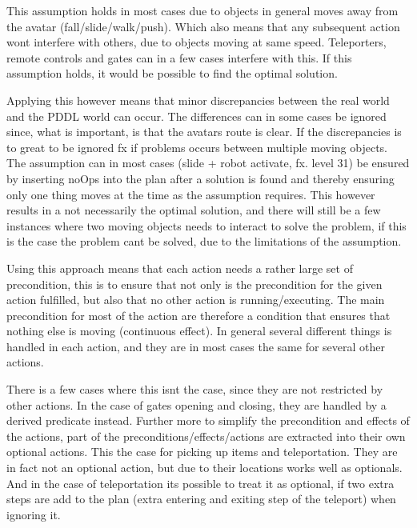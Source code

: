 		This assumption holds in most cases due to objects in general moves away from the avatar (fall/slide/walk/push). Which also means that any subsequent action wont interfere with others, due to objects moving at same speed. Teleporters, remote controls and gates can in a few cases interfere with this. If this assumption holds, it would be possible to find the optimal solution.
		
		Applying this however means that minor discrepancies between the real world and the PDDL world can occur. The differences can in some cases be ignored since, what is important, is that the avatars route is clear. If the discrepancies is to great to be ignored fx if problems occurs between multiple moving objects. The assumption can in most cases (slide + robot activate, fx. level 31) be ensured by inserting noOps into the plan after a solution is found and thereby ensuring only one thing moves at the time as the assumption requires. This however results in a not necessarily the optimal solution, and there will still be a few instances where two moving objects needs to interact to solve the problem, if this is the case the problem cant be solved, due to the limitations of the assumption.
			
		Using this approach means that each action needs a rather large set of precondition, this is to ensure that not only is the precondition for the given action fulfilled, but also that no other action is running/executing. The main precondition for most of the action are therefore a condition that ensures that nothing else is moving (continuous effect). In general several different things is handled in each action, and they are in most cases the same for several other actions. %
		
		There is a few cases where this isnt the case, since they are not restricted by other actions. In the case of gates opening and closing, they are handled by a derived predicate instead. 
		Further more to simplify the precondition and effects of the actions, part of the preconditions/effects/actions are extracted into their own optional actions. This the case for picking up items and teleportation. They are in fact not an optional action, but due to their locations works well as optionals. And in the case of teleportation its possible to treat it as optional, if two extra steps are add to the plan (extra entering and exiting step of the teleport) when ignoring it.
		
